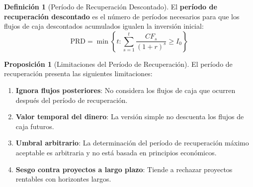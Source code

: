 \documentclass[12pt,a4paper]{article}
\theoremstyle{definition}
\newtheorem{definicion}{Definición}[section]
\newtheorem{proposicion}{Proposición}[section]
\begin{document}
\begin{definicion}[Período de Recuperación Descontado]
El \textbf{período de recuperación descontado} es el número de períodos necesarios para que los flujos de caja descontados acumulados igualen la inversión inicial:
\begin{equation}
\text{PRD} = \min\left\{t : \sum_{s=1}^{t} \frac{CF_s}{(1+r)^s} \geq I_0\right\}
\end{equation}
\end{definicion}

\begin{center}
    
\end{center}

\begin{proposicion}[Limitaciones del Período de Recuperación]
El período de recuperación presenta las siguientes limitaciones:

\begin{enumerate}
\item \textbf{Ignora flujos posteriores}: No considera los flujos de caja que ocurren después del período de recuperación.

\item \textbf{Valor temporal del dinero}: La versión simple no descuenta los flujos de caja futuros.

\item \textbf{Umbral arbitrario}: La determinación del período de recuperación máximo aceptable es arbitraria y no está basada en principios económicos.

\item \textbf{Sesgo contra proyectos a largo plazo}: Tiende a rechazar proyectos rentables con horizontes largos.
\end{enumerate}
\end{proposicion}
\end{document}
